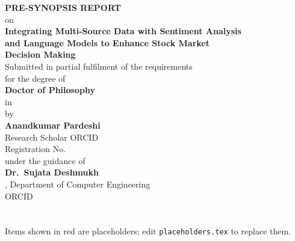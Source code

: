 \documentclass[11pt,a4paper,oneside]{report}
\begin{document}
\pagestyle{plain}

\begin{titlepage}
\centering
\vspace*{0.4cm}
{\large\bfseries PRE-SYNOPSIS REPORT}\\[0.3cm]
{\normalsize on}\\[0.45cm]
{\large\bfseries Integrating Multi-Source Data with Sentiment Analysis\\[2pt]
and Language Models to Enhance Stock Market\\[2pt] Decision Making}\\[1.0cm]
{\normalsize Submitted in partial fulfilment of the requirements\\ for the degree of}\\[0.3cm]
{\large\bfseries Doctor of Philosophy}\\[0.15cm]
{\normalsize in \Discipline}\\[1.0cm]
{\normalsize by}\\[0.25cm]
{\large\bfseries Anandkumar Pardeshi}\\[0.12cm]
{\normalsize Research Scholar \quad ORCID \ScholarORCID}\\[0.12cm]
{\normalsize Registration No.\ \RegNo}\\[1.0cm]
{\normalsize under the guidance of}\\[0.25cm]
{\large\bfseries Dr.\ Sujata Deshmukh}\\[0.12cm]
{\normalsize \GuideDesignation, Department of Computer Engineering}\\[0.12cm]
{\normalsize ORCID \GuideORCID}\\[1.2cm]
{\normalsize \ResearchCentre}\\[0.2cm]
{\normalsize \Univ}\\[1.2cm]
{\normalsize \SubMonth}
\vfill
{\footnotesize\color{phcolor} Items shown in red are placeholders; edit
\texttt{placeholders.tex} to replace them.}
\end{titlepage}



\clearpage
{}
\setcounter{page}{1}





\end{document}
